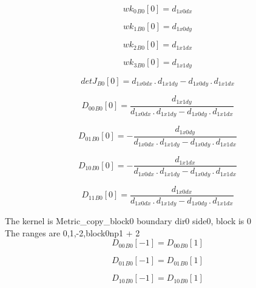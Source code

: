 \documentclass{article}
\begin{document}
\begin{dmath}{wk_{0}{_{B0}}}[{0}] = d_{1 x0 dx}\end{dmath}

\begin{dmath}{wk_{1}{_{B0}}}[{0}] = d_{1 x0 dy}\end{dmath}

\begin{dmath}{wk_{2}{_{B0}}}[{0}] = d_{1 x1 dx}\end{dmath}

\begin{dmath}{wk_{3}{_{B0}}}[{0}] = d_{1 x1 dy}\end{dmath}

\begin{dmath}{detJ{_{B0}}}[{0}] = d_{1 x0 dx} \,.\, d_{1 x1 dy} - d_{1 x0 dy} \,.\, d_{1 x1 dx}\end{dmath}

\begin{dmath}{D_{00}{_{B0}}}[{0}] = \frac{d_{1 x1 dy}}{d_{1 x0 dx} \,.\, d_{1 x1 dy} - d_{1 x0 dy} \,.\, d_{1 x1 dx}}\end{dmath}

\begin{dmath}{D_{01}{_{B0}}}[{0}] = - \frac{d_{1 x0 dy}}{d_{1 x0 dx} \,.\, d_{1 x1 dy} - d_{1 x0 dy} \,.\, d_{1 x1 dx}}\end{dmath}

\begin{dmath}{D_{10}{_{B0}}}[{0}] = - \frac{d_{1 x1 dx}}{d_{1 x0 dx} \,.\, d_{1 x1 dy} - d_{1 x0 dy} \,.\, d_{1 x1 dx}}\end{dmath}

\begin{dmath}{D_{11}{_{B0}}}[{0}] = \frac{d_{1 x0 dx}}{d_{1 x0 dx} \,.\, d_{1 x1 dy} - d_{1 x0 dy} \,.\, d_{1 x1 dx}}\end{dmath}

\noindent The kernel is Metric_copy_block0 boundary dir0 side0, block is 0\\\noindent The ranges are 0,1,-2,block0np1 + 2\\\begin{dmath}{D_{00}{_{B0}}}[{-1}] = {D_{00}{_{B0}}}[{1}]\end{dmath}

\begin{dmath}{D_{01}{_{B0}}}[{-1}] = {D_{01}{_{B0}}}[{1}]\end{dmath}

\begin{dmath}{D_{10}{_{B0}}}[{-1}] = {D_{10}{_{B0}}}[{1}]\end{dmath}
\end{document}
